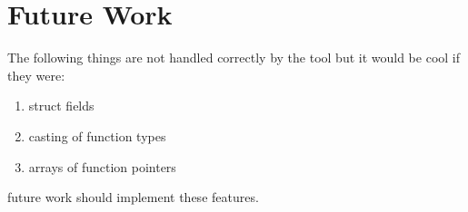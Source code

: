 \chapter{Future Work}\label{sec:future}

The following things are not handled correctly by the tool but it would be cool if they were:

\begin{enumerate}
    \item struct fields
    \item casting of function types
    \item arrays of function pointers
\end{enumerate}

future work should implement these features.
